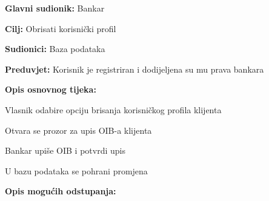             
            \noindent {}
            \begin{packed_item}
            
              \item \textbf{Glavni sudionik: }Bankar
              \item  \textbf{Cilj:} Obrisati korisnički profil 
              \item  \textbf{Sudionici:} Baza podataka
              \item  \textbf{Preduvjet:} Korisnik je registriran i dodijeljena su mu prava bankara 
              \item  \textbf{Opis osnovnog tijeka:}
              
              \item[] \begin{packed_enum}
            
                \item  Vlasnik odabire  opciju brisanja korisničkog profila klijenta
                \item  Otvara se prozor za upis OIB-a klijenta
                \item  Bankar  upiše OIB  i potvrdi upis
                \item  U bazu podataka se pohrani promjena 
              \end{packed_enum}
              
              \item  \textbf{Opis mogućih odstupanja:}
              
              \item[] 
            \end{packed_item}
            
